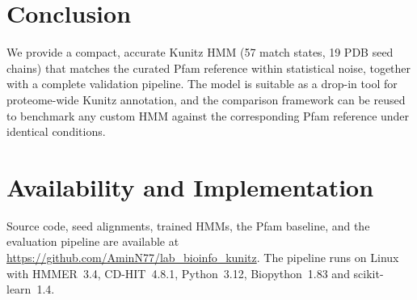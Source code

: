\documentclass[11pt,a4paper]{article}
\begin{document}
\section{Conclusion}
We provide a compact, accurate Kunitz HMM (57 match states, 19 PDB seed chains) that matches the curated Pfam reference within statistical noise, together with a complete validation pipeline. The model is suitable as a drop-in tool for proteome-wide Kunitz annotation, and the comparison framework can be reused to benchmark any custom HMM against the corresponding Pfam reference under identical conditions.

\section*{Availability and Implementation}
Source code, seed alignments, trained HMMs, the Pfam baseline, and the evaluation pipeline are available at \url{https://github.com/AminN77/lab_bioinfo_kunitz}. The pipeline runs on Linux with HMMER~3.4, CD-HIT~4.8.1, Python~3.12, Biopython~1.83 and scikit-learn~1.4.
\end{document}
